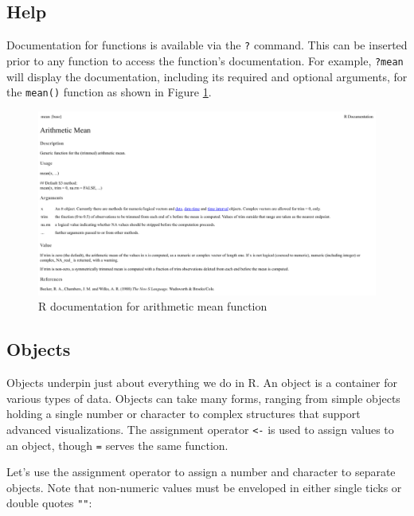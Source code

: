 \documentclass[
]{book}
\begin{document}
\hypertarget{help}{%
\subsection{Help}\label{help}}

Documentation for functions is available via the \texttt{?} command. This can be inserted prior to any function to access the function's documentation. For example, \texttt{?mean} will display the documentation, including its required and optional arguments, for the \texttt{mean()} function as shown in Figure \ref{fig:r-help}.

\begin{figure}

{\centering \includegraphics[width=1\linewidth]{graphics/r_help} 

}

\caption{R documentation for arithmetic mean function}\label{fig:r-help}
\end{figure}

\hypertarget{objects}{%
\subsection{Objects}\label{objects}}

Objects underpin just about everything we do in R. An object is a container for various types of data. Objects can take many forms, ranging from simple objects holding a single number or character to complex structures that support advanced visualizations. The assignment operator \texttt{\textless{}-} is used to assign values to an object, though \texttt{=} serves the same function.

Let's use the assignment operator to assign a number and character to separate objects. Note that non-numeric values must be enveloped in either single ticks \texttt{\textquotesingle{}\textquotesingle{}} or double quotes \texttt{""}:
\end{document}

